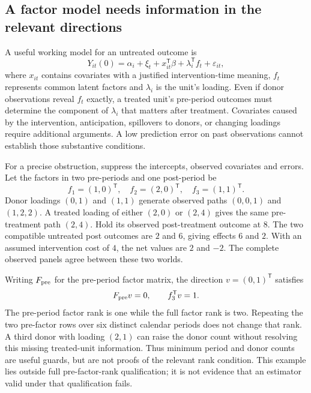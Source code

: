 \subsection{A factor model needs information in the relevant directions}
\label{exec21:gsynth-rank}

A useful working model for an untreated outcome is
\begin{equation}
\label{exec21:gsynth-factor}
 Y_{it}(0)=\alpha_i+\xi_t+x_{it}^{\mathsf T}\beta
                     +\lambda_i^{\mathsf T}f_t+\varepsilon_{it},
\end{equation}
where $x_{it}$ contains covariates with a justified intervention-time meaning,
$f_t$ represents common latent factors and $\lambda_i$ is the unit's loading.
Even if donor observations reveal $f_t$ exactly, a treated unit's pre-period
outcomes must determine the component of $\lambda_i$ that matters after
treatment. Covariates caused by the intervention, anticipation, spillovers
to donors, or changing loadings require additional arguments. A low prediction
error on past observations cannot establish those substantive conditions.

For a precise obstruction, suppress the intercepts, observed covariates and
errors. Let the factors in two pre-periods and one post-period be
\begin{equation}
\label{exec21:gsynth-witness}
 f_1=(1,0)^{\mathsf T},\quad f_2=(2,0)^{\mathsf T},\quad
 f_3=(1,1)^{\mathsf T}.
\end{equation}
Donor loadings $(0,1)$ and $(1,1)$ generate observed paths $(0,0,1)$ and
$(1,2,2)$. A treated loading of either $(2,0)$ or $(2,4)$ gives the same
pre-treatment path $(2,4)$. Hold its observed post-treatment outcome at $8$.
The two compatible untreated post outcomes are $2$ and $6$, giving effects
$6$ and $2$. With an assumed intervention cost of $4$, the net values are $2$
and $-2$. The complete observed panels agree between these two worlds.
\citep{exec21_gsynth_reference}

Writing $F_{\rm pre}$ for the pre-period factor matrix, the direction
$v=(0,1)^{\mathsf T}$ satisfies
\begin{equation}
\label{exec21:gsynth-null}
 F_{\rm pre}v=0,\qquad f_3^{\mathsf T}v=1.
\end{equation}
The pre-period factor rank is one while the full factor rank is two.
Repeating the two pre-factor rows over six distinct calendar periods does
not change that rank. A third donor with loading $(2,1)$ can raise the donor
count without resolving this missing treated-unit information. Thus minimum
period and donor counts are useful guards, but are not proofs of the relevant
rank condition. This example lies outside full pre-factor-rank qualification;
it is not evidence that an estimator valid under that qualification fails.
\citep{exec21_gsynth_reference}

